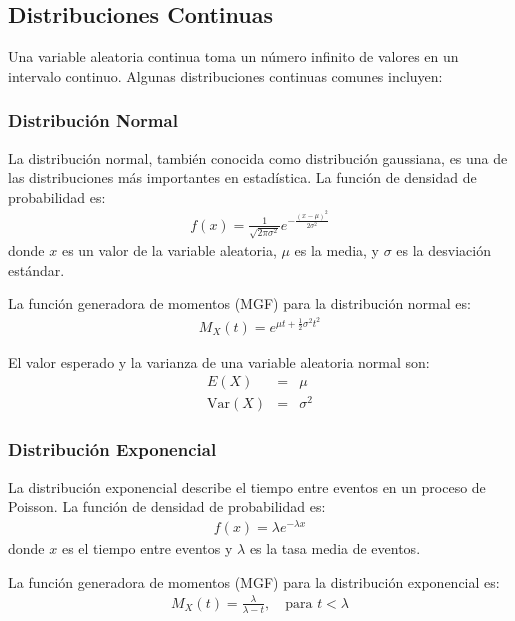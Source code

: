 \subsection{Distribuciones Continuas}

Una variable aleatoria continua toma un n\'umero infinito de valores en un intervalo continuo. Algunas distribuciones continuas comunes incluyen:

\subsubsection{Distribuci\'on Normal}

La distribuci\'on normal, tambi\'en conocida como distribuci\'on gaussiana, es una de las distribuciones m\'as importantes en estad\'istica. La funci\'on de densidad de probabilidad es:
\begin{eqnarray*}
f(x) = \frac{1}{\sqrt{2\pi\sigma^2}} e^{-\frac{(x-\mu)^2}{2\sigma^2}}
\end{eqnarray*}
donde $x$ es un valor de la variable aleatoria, $\mu$ es la media, y $\sigma$ es la desviaci\'on est\'andar.

La funci\'on generadora de momentos (MGF) para la distribuci\'on normal es:
\begin{eqnarray*}
M_X(t) = e^{\mu t + \frac{1}{2} \sigma^2 t^2}
\end{eqnarray*}

El valor esperado y la varianza de una variable aleatoria normal son:
\begin{eqnarray*}
E(X) &=& \mu \\
\text{Var}(X) &=& \sigma^2
\end{eqnarray*}

\subsubsection{Distribuci\'on Exponencial}

La distribuci\'on exponencial describe el tiempo entre eventos en un proceso de Poisson. La funci\'on de densidad de probabilidad es:
\begin{eqnarray*}
f(x) = \lambda e^{-\lambda x}
\end{eqnarray*}
donde $x$ es el tiempo entre eventos y $\lambda$ es la tasa media de eventos.

La funci\'on generadora de momentos (MGF) para la distribuci\'on exponencial es:
\begin{eqnarray*}
M_X(t) = \frac{\lambda}{\lambda - t}, \quad \text{para } t < \lambda
\end{eqnarray*}

